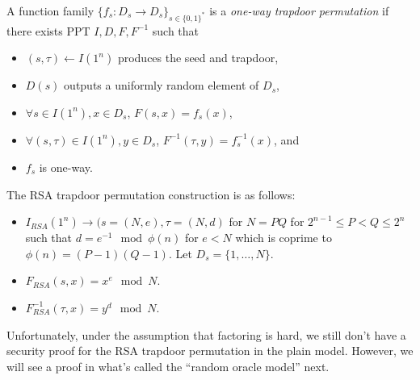 \begin{definition} 
A function family $\{f_s: D_s \to D_s\}_{s \in \{0,1\}^*}$ is a \emph{one-way trapdoor permutation} if there exists PPT $I, D, F, F^{-1}$ such that 
\begin{itemize}
    \item $(s, \tau) \leftarrow I(1^n)$ produces the seed and trapdoor, 
    
    \item $D(s)$ outputs a uniformly random element of $D_s$, 

    \item $\forall s \in I(1^n), x \in D_s$, $F(s, x) = f_s(x)$, 

    \item $\forall (s, \tau) \in I(1^n), y \in D_s$, $F^{-1}(\tau, y) = f_s^{-1}(x)$, and 

    \item $f_s$ is one-way. 
\end{itemize}
\end{definition} 

The RSA trapdoor permutation construction is as follows: 
\begin{itemize} 
    
    \item $I_{RSA}(1^n) \rightarrow (s = (N, e), \tau = (N, d)$ for $N = PQ$ for $2^{n-1} \leq P < Q \leq 2^n$ such that $d = e^{-1} \mod \phi(n)$ for $e < N$ which is coprime to $\phi(n) = (P-1)(Q-1)$. 
    Let $D_s = \{1, \ldots, N\}$. 

    \item $F_{RSA}(s, x) = x^e \mod N$. 

    \item $F_{RSA}^{-1}(\tau, x) = y^d \mod N$. 
\end{itemize}
Unfortunately, under the assumption that factoring is hard, we still don't have a security proof for the RSA trapdoor permutation in the plain model. 
However, we will see a proof in what's called the ``random oracle model'' next. 




